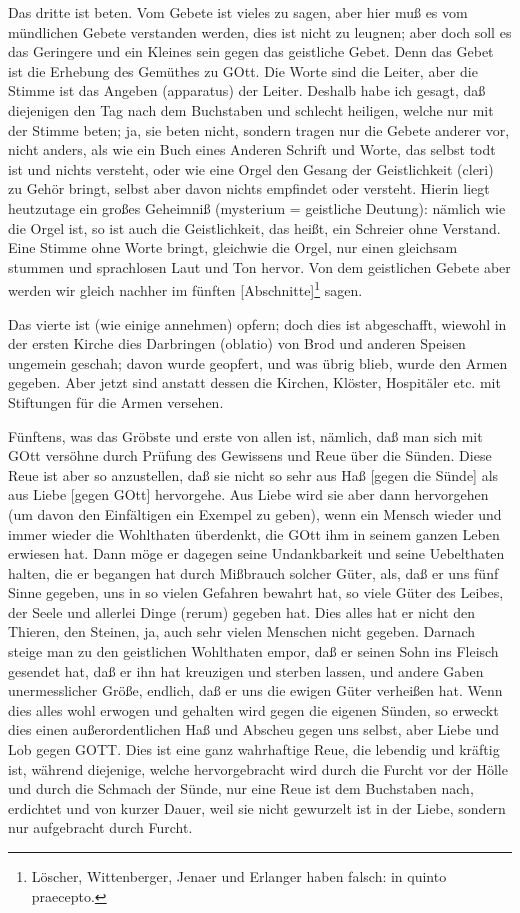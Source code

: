Das dritte ist beten. Vom Gebete ist vieles zu sagen, aber hier muß es vom mündlichen Gebete verstanden werden, dies ist nicht zu leugnen; aber doch soll es das Geringere und ein Kleines sein gegen das geistliche Gebet. Denn das Gebet ist die Erhebung des Gemüthes zu GOtt. Die Worte sind die Leiter, aber die Stimme ist das Angeben (apparatus) der Leiter. Deshalb habe ich gesagt, daß diejenigen den Tag nach dem Buchstaben und schlecht heiligen, welche nur mit der Stimme beten; ja, sie beten nicht, sondern tragen nur die Gebete anderer vor, nicht anders, als wie ein Buch eines Anderen Schrift und Worte, das selbst todt ist und nichts versteht, oder wie eine Orgel den Gesang der Geistlichkeit (cleri) zu Gehör bringt, selbst aber davon nichts empfindet oder versteht. Hierin liegt heutzutage ein großes Geheimniß (mysterium = geistliche Deutung): nämlich wie die Orgel ist, so ist auch die Geistlichkeit, das heißt, ein Schreier ohne Verstand. Eine Stimme ohne Worte bringt, gleichwie die Orgel, nur einen gleichsam stummen und sprachlosen Laut und Ton hervor. Von dem geistlichen Gebete aber werden wir gleich nachher im fünften [Abschnitte]\footnote{Löscher, Wittenberger, Jenaer und Erlanger haben falsch: in quinto praecepto.} sagen.

Das vierte ist (wie einige annehmen) opfern; doch dies ist abgeschafft, wiewohl in der ersten Kirche dies Darbringen (oblatio) von Brod und anderen Speisen ungemein geschah; davon wurde geopfert, und was übrig blieb, wurde den Armen gegeben. Aber jetzt sind anstatt dessen die Kirchen, Klöster, Hospitäler etc. mit Stiftungen für die Armen versehen.

Fünftens, was das Gröbste und erste von allen ist, nämlich, daß man sich mit GOtt versöhne durch Prüfung des Gewissens und Reue über die Sünden. Diese Reue ist aber so anzustellen, daß sie nicht so sehr aus Haß [gegen die Sünde] als aus Liebe [gegen GOtt] hervorgehe. Aus Liebe wird sie aber dann hervorgehen (um davon den Einfältigen ein Exempel zu geben), wenn ein Mensch wieder und immer wieder die Wohlthaten überdenkt, die GOtt ihm in seinem ganzen Leben erwiesen hat. Dann
möge er dagegen seine Undankbarkeit und seine Uebelthaten halten, die er begangen hat durch Mißbrauch solcher Güter, als, daß er uns fünf Sinne gegeben, uns in so vielen Gefahren bewahrt hat, so viele Güter des Leibes, der Seele und allerlei Dinge (rerum) gegeben hat. Dies alles hat er nicht den Thieren, den Steinen, ja, auch sehr vielen Menschen nicht gegeben. Darnach steige man zu den geistlichen Wohlthaten empor, daß er seinen Sohn ins Fleisch gesendet hat, daß er ihn hat kreuzigen und sterben lassen, und andere Gaben unermesslicher Größe, endlich, daß er uns die ewigen Güter verheißen hat. Wenn dies alles wohl erwogen und gehalten wird gegen die eigenen Sünden, so erweckt dies einen außerordentlichen Haß und Abscheu gegen uns selbst, aber Liebe und Lob gegen GOTT. Dies ist eine ganz wahrhaftige Reue, die lebendig und kräftig ist, während diejenige, welche hervorgebracht wird durch die Furcht vor der Hölle und durch die Schmach der Sünde, nur eine Reue ist dem Buchstaben nach, erdichtet und von kurzer Dauer, weil sie nicht gewurzelt ist in der Liebe, sondern nur aufgebracht durch Furcht.

